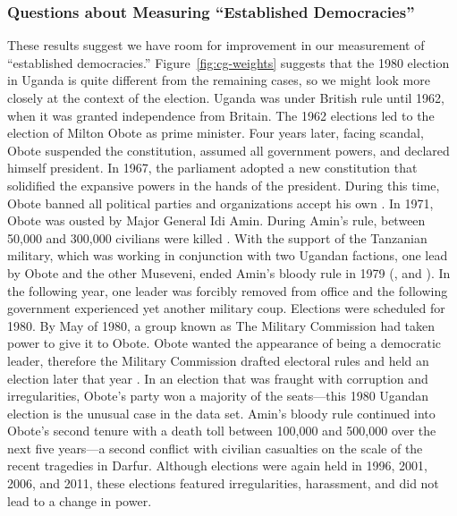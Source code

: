 \documentclass[12pt]{article}
\begin{document}
\subsubsection*{Questions about Measuring ``Established Democracies''}

These results suggest we have room for improvement in our measurement of ``established democracies.'' 
Figure~\ref{fig:cg-weights} suggests that the 1980 election in Uganda is quite different from the remaining cases, so we might look more closely at the context of the election.
Uganda was under British rule until 1962, when it was granted independence from Britain. 
The 1962 elections led to the election of Milton Obote as prime minister. 
Four years later, facing scandal, Obote suspended the constitution, assumed all government powers, and declared himself president. 
In 1967, the parliament adopted a new constitution that solidified the expansive powers in the hands of the president. 
During this time, Obote banned all political parties and organizations accept his own \citep[p. 99]{Kasozi1993}. 
In 1971, Obote was ousted by Major General Idi Amin. During Amin's rule, between 50,000 and 300,000 civilians were killed \citep[p. 104]{Kasozi1993}. 
With the support of the Tanzanian military, which was working in conjunction with two Ugandan factions, one lead by Obote and the other Museveni, ended Amin's bloody rule in 1979 (\citealt[p. 53]{Kasfir1998}, and \citealt[pp. 124--127]{Kasozi1993}).
In the following year, one leader was forcibly removed from office and the following government experienced yet another military coup.
Elections were scheduled for 1980. 
By May of 1980, a group known as The Military Commission had taken power to give it to Obote. 
Obote wanted the appearance of being a democratic leader, therefore the Military Commission drafted electoral rules and held an election later that year \citep[pp. 135--137]{Kasozi1993}.
In an election that was fraught with corruption and irregularities, Obote's party won a majority of the seats---this 1980 Ugandan election is the unusual case in the data set.
Amin's bloody rule continued into Obote's second tenure with a death toll between 100,000 and 500,000 over the next five years---a second conflict with civilian casualties on the scale of the recent tragedies in Darfur. 
Although elections were again held in 1996, 2001, 2006, and 2011, these elections featured irregularities, harassment, and did not lead to a change in power.
\end{document}
